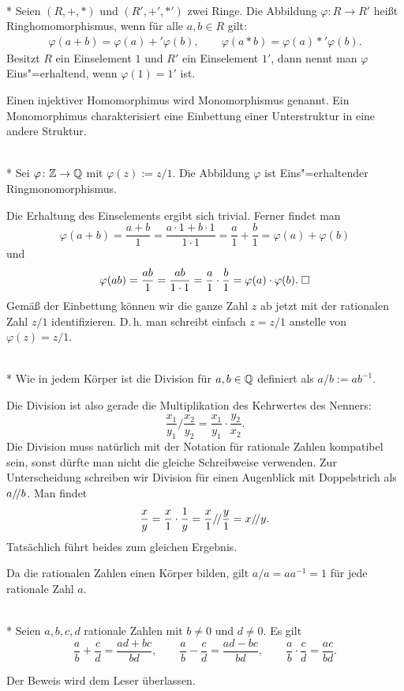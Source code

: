 \newpage
\begin{Definition}[Ringhomomorphismus]\mbox{}\\*
Seien $(R,+,*)$ und $(R',+',*')$ zwei Ringe. Die Abbildung
$\varphi\colon R\to R'$ heißt Ringhomomorphismus, wenn für alle
$a,b\in R$ gilt:
\begin{align*}
\varphi(a+b) = \varphi(a)+'\varphi(b),\qquad
\varphi(a*b) = \varphi(a)*'\varphi(b).
\end{align*}
Besitzt $R$ ein Einselement $1$ und $R'$ ein Einselement $1'$,
dann nennt man $\varphi$ Eins"=erhaltend, wenn $\varphi(1)=1'$ ist.
\end{Definition}
Einen injektiver Homomorphimus wird Monomorphismus genannt. Ein
Monomorphimus charakterisiert eine Einbettung einer Unterstruktur
in eine andere Struktur.
\begin{Satz}\mbox{}\\*
Sei $\varphi\colon\mathbb Z\to\mathbb Q$ mit $\varphi(z):=z/1$. Die
Abbildung $\varphi$ ist Eins"=erhaltender Ringmonomorphismus.
\end{Satz}
 Die Erhaltung des Einselements ergibt sich
trivial. Ferner findet man
\[\varphi(a+b) = \frac{a+b}{1} = \frac{a\cdot 1+b\cdot 1}{1\cdot 1}
= \frac{a}{1}+\frac{b}{1} = \varphi(a)+\varphi(b)\]
und
\[\varphi(ab) = \frac{ab}{1} = \frac{ab}{1\cdot 1} = \frac{a}{1}\cdot\frac{b}{1}
= \varphi(a)\cdot\varphi(b).\;\Box\]
Gemäß der Einbettung können wir die ganze Zahl $z$ ab jetzt
mit der rationalen Zahl $z/1$ identifizieren. D.\,h. man schreibt
einfach $z=z/1$ anstelle von $\varphi(z)=z/1$.

\begin{Definition}\mbox{}\\*
Wie in jedem Körper ist die Division für $a,b\in\mathbb Q$
definiert als $a/b := ab^{-1}$.
\end{Definition}
Die Division ist also gerade die Multiplikation des Kehrwertes
des Nenners:
\[\frac{x_1}{y_1}/\frac{x_2}{y_2} = \frac{x_1}{y_1}\cdot\frac{y_2}{x_2}.\]
Die Division muss natürlich mit der Notation für rationale Zahlen
kompatibel sein, sonst dürfte man nicht die gleiche Schreibweise
verwenden. Zur Unterscheidung schreiben wir Division für einen
Augenblick mit Doppelstrich als $a/\!/ b$. Man findet
\[\frac{x}{y} = \frac{x}{1}\cdot\frac{1}{y}
= \frac{x}{1}/\!/\frac{y}{1} = x/\!/ y.\]
Tatsächlich führt beides zum gleichen Ergebnis.

Da die rationalen Zahlen einen Körper bilden, gilt $a/a=aa^{-1}=1$
für jede rationale Zahl $a$.

\begin{Satz}\mbox{}\\*
Seien $a,b,c,d$ rationale Zahlen mit $b\ne 0$ und $d\ne 0$. Es gilt
\[\frac{a}{b}+\frac{c}{d} = \frac{ad+bc}{bd},
\qquad \frac{a}{b}-\frac{c}{d} = \frac{ad-bc}{bd},
\qquad \frac{a}{b}\cdot\frac{c}{d} = \frac{ac}{bd}.\]
\end{Satz}
Der Beweis wird dem Leser überlassen.
